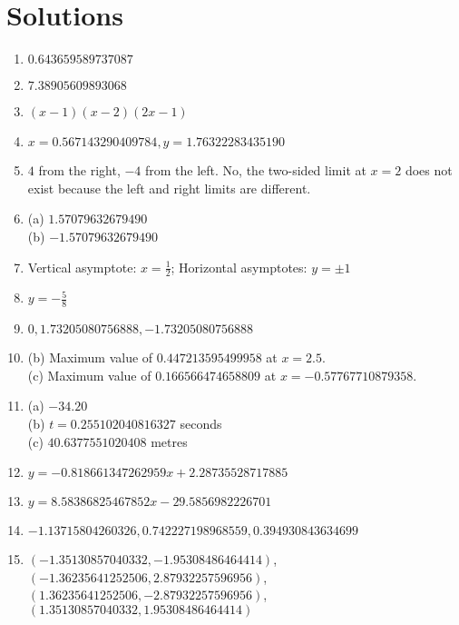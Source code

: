 \clearpage

\section*{Solutions}

\begin{enumerate}
    \item $0.643659589737087$
    \item $7.38905609893068$
    \item $\left(x-1\right) \left(x-2\right) \left(2 x-1\right)$
    \item $x= 0.567143290409784, y= 1.76322283435190$
    \item $4$ from the right, $-4$ from the left. No, the two-sided limit at $x = 2$ does not exist because the left and right limits are different.
    \item (a) $1.57079632679490$\\ (b) $-1.57079632679490$
    \item Vertical asymptote: $x=\frac{1}{2}$; Horizontal asymptotes: $y=\pm 1$
    \item $y=-\frac{5}{8}$
    \item $0, 1.73205080756888,- 1.73205080756888$
    \item (b) Maximum value of $0.447213595499958$ at $x=2.5$. \\(c) Maximum value of $0.166566474658809$ at $x=-0.57767710879358$.
    \item (a) $- 34.20$ \\(b) $t=0.255102040816327$ seconds \\(c) $40.6377551020408$ metres
    \item $y=-0.818661347262959 x + 2.28735528717885$
    \item $y=8.58386825467852 x - 29.5856982226701$
    \item $-1.13715804260326, 0.742227198968559, 0.394930843634699$
    \item $(-1.35130857040332, -1.95308486464414)$, $(-1.36235641252506, 2.87932257596956)$, $(1.36235641252506, -2.87932257596956)$, $(1.35130857040332, 1.95308486464414)$
\end{enumerate}